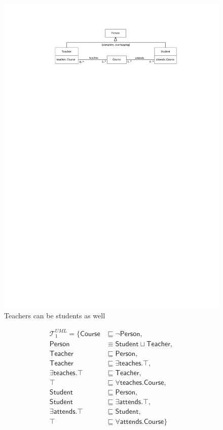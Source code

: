 \documentclass{amsart}
\begin{document}
     \begin{figure}
    \centering \includegraphics[trim = 40mm 235mm 30mm 20mm, clip, scale=0.9]{./UniversityClassDiagram2Simplified.pdf}
    \caption{Teachers can be students as well}\label{fig_UniversityClassDiagram2}
    \end{figure}  

    
     \begin{align*}
	\mathcal{T}_1^{UML} = \{\mathsf{Course} &\sqsubseteq \neg \mathsf{Person},\\
	\mathsf{Person} &\equiv \mathsf{Student} \sqcup \mathsf{Teacher}, \\   
	\mathsf{Teacher} &\sqsubseteq \mathsf{Person}, \\
	\mathsf{Teacher} &\sqsubseteq \exists \mathsf{teaches}.\top, \\
	\exists\mathsf{teaches}.\top &\sqsubseteq \mathsf{Teacher}, \\
	\top &\sqsubseteq \forall \mathsf{teaches}.\mathsf{Course}, \\
	\mathsf{Student} &\sqsubseteq \mathsf{Person},\\
	\mathsf{Student} &\sqsubseteq \exists \mathsf{attends}.\top, \\
	\exists\mathsf{attends}.\top &\sqsubseteq \mathsf{Student}, \\
	\top &\sqsubseteq \forall \mathsf{attends}.\mathsf{Course}\} 
  \end{align*}     
 
\end{document}
